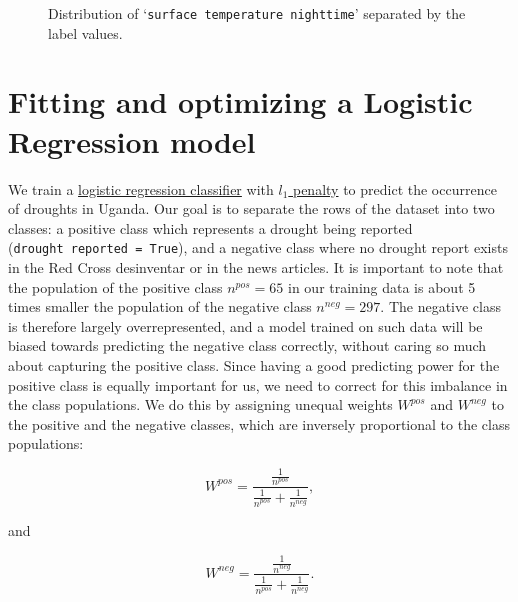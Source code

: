 \documentclass[10pt,parskip=half,
toc=sectionentrywithdots,
bibliography=totocnumbered,
captions=tableheading,numbers=noendperiod]{scrartcl}
\begin{document}
\begin{figure}[H]\begin{center}\end{center}\caption{Distribution of `\texttt{surface\ temperature\ nighttime}' separated by
the label values.}\label{fig_dist19}\end{figure}

\hypertarget{fitting-and-optimizing-a-logistic-regression-model}{%
\section{Fitting and optimizing a Logistic Regression
model}\label{fitting-and-optimizing-a-logistic-regression-model}}

We train a
\href{https://scikit-learn.org/stable/modules/generated/sklearn.linear_model.LogisticRegression.html}{logistic
regression classifier} with
\href{https://scikit-learn.org/stable/auto_examples/linear_model/plot_logistic_l1_l2_sparsity.html}{\(l_1\)
penalty} to predict the occurrence of droughts in Uganda. Our goal is to
separate the rows of the dataset into two classes: a positive class
which represents a drought being reported
(\texttt{\textquotesingle{}drought\ reported\textquotesingle{}\ =\ True}),
and a negative class where no drought report exists in the Red Cross
desinventar or in the news articles. It is important to note that the
population of the positive class \(n^{pos}= 65\) in our training data is
about 5 times smaller the population of the negative class
\(n^{neg}= 297\). The negative class is therefore largely
overrepresented, and a model trained on such data will be biased towards
predicting the negative class correctly, without caring so much about
capturing the positive class. Since having a good predicting power for
the positive class is equally important for us, we need to correct for
this imbalance in the class populations. We do this by assigning unequal
weights \(W^{pos}\) and \(W^{neg}\) to the positive and the negative
classes, which are inversely proportional to the class populations:

\begin{equation}\label{eqn_wpos}
W^{pos}=\frac{\frac{1}{n^{pos}}}{\frac{1}{n^{pos}}+\frac{1}{n^{neg}}},
\end{equation}

and

\begin{equation}\label{eqn_wneg}
W^{neg}=\frac{\frac{1}{n^{neg}}}{\frac{1}{n^{pos}}+\frac{1}{n^{neg}}}.
\end{equation}
\end{document}
